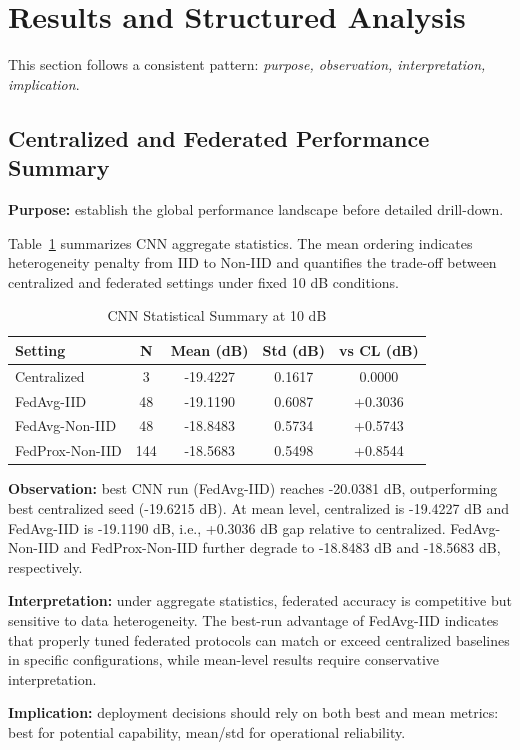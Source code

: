\documentclass[onecolumn]{IEEEtran}
\begin{document}
\section{Results and Structured Analysis}
This section follows a consistent pattern: \textit{purpose, observation, interpretation, implication}.

\subsection{Centralized and Federated Performance Summary}
\textbf{Purpose:} establish the global performance landscape before detailed drill-down.

Table~\ref{tab:cnn_stats} summarizes CNN aggregate statistics. The mean ordering indicates heterogeneity penalty from IID to Non-IID and quantifies the trade-off between centralized and federated settings under fixed 10 dB conditions.

\begin{table}[t]
\caption{CNN Statistical Summary at 10 dB}
\label{tab:cnn_stats}
\centering
\begin{tabular}{lcccc}
\toprule
Setting & N & Mean (dB) & Std (dB) & vs CL (dB) \\
\midrule
Centralized & 3 & -19.4227 & 0.1617 & 0.0000 \\
FedAvg-IID & 48 & -19.1190 & 0.6087 & +0.3036 \\
FedAvg-Non-IID & 48 & -18.8483 & 0.5734 & +0.5743 \\
FedProx-Non-IID & 144 & -18.5683 & 0.5498 & +0.8544 \\
\bottomrule
\end{tabular}
\end{table}

\textbf{Observation:} best CNN run (FedAvg-IID) reaches -20.0381 dB, outperforming best centralized seed (-19.6215 dB). At mean level, centralized is -19.4227 dB and FedAvg-IID is -19.1190 dB, i.e., +0.3036 dB gap relative to centralized. FedAvg-Non-IID and FedProx-Non-IID further degrade to -18.8483 dB and -18.5683 dB, respectively.

\textbf{Interpretation:} under aggregate statistics, federated accuracy is competitive but sensitive to data heterogeneity. The best-run advantage of FedAvg-IID indicates that properly tuned federated protocols can match or exceed centralized baselines in specific configurations, while mean-level results require conservative interpretation.

\textbf{Implication:} deployment decisions should rely on both best and mean metrics: best for potential capability, mean/std for operational reliability.
\end{document}
